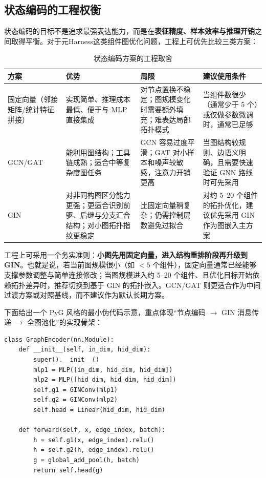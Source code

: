 \subsection{状态编码的工程权衡}

状态编码的目标不是追求最强表达能力，而是在\textbf{表征精度、样本效率与推理开销}之间取得平衡。对于元Harness这类组件图优化问题，工程上可优先比较三类方案：

\begin{table}[htbp]
\centering
\caption{状态编码方案的工程取舍}
\label{tab:state_encoding_tradeoffs}
\begin{tabular}{p{2.7cm}p{3.0cm}p{3.6cm}p{4.2cm}}
\hline
\textbf{方案} & \textbf{优势} & \textbf{局限} & \textbf{建议使用条件} \\
\hline
固定向量（邻接矩阵\slash 统计特征拼接） & 实现简单、推理成本最低、便于与 MLP 直接集成 & 对节点置换不稳定；图规模变化时需要额外填充；难表达局部拓扑模式 & 当组件数很少（通常少于 5 个）或仅做参数微调时，通常已足够 \\
GCN\slash GAT & 能利用图结构；工具链成熟；适合中等复杂度图任务 & GCN 容易过度平滑；GAT 对小样本和噪声较敏感，注意力开销更高 & 当图结构较规则、边语义明确，且需要快速验证 GNN 路线时可先采用 \\
GIN & 对非同构图区分能力更强；更适合识别前驱、后继与分支汇合结构；对小图拓扑指纹更稳定 & 比固定向量稍复杂；仍需控制层数避免过拟合 & 对约 5--20 个组件的拓扑优化，建议优先采用 GIN 作为图嵌入主方案 \\
\hline
\end{tabular}
\end{table}

工程上可采用一个务实准则：\textbf{小图先用固定向量，进入结构重排阶段再升级到 GIN}。也就是说，若当前图规模很小（如 $<5$ 个组件），固定向量通常已经能够支撑参数调整与简单连接修改；当图规模进入约 5--20 个组件、且优化目标开始依赖拓扑差异时，推荐切换到基于 GIN 的拓扑嵌入。GCN/GAT 则更适合作为中间过渡方案或对照基线，而不建议作为默认长期方案。

下面给出一个 PyG 风格的最小伪代码示意，重点体现“节点编码 $\rightarrow$ GIN 消息传递 $\rightarrow$ 全图池化”的实现骨架：

\begin{verbatim}
class GraphEncoder(nn.Module):
    def __init__(self, in_dim, hid_dim):
        super().__init__()
        mlp1 = MLP([in_dim, hid_dim, hid_dim])
        mlp2 = MLP([hid_dim, hid_dim, hid_dim])
        self.g1 = GINConv(mlp1)
        self.g2 = GINConv(mlp2)
        self.head = Linear(hid_dim, hid_dim)

    def forward(self, x, edge_index, batch):
        h = self.g1(x, edge_index).relu()
        h = self.g2(h, edge_index).relu()
        g = global_add_pool(h, batch)
        return self.head(g)
\end{verbatim}

